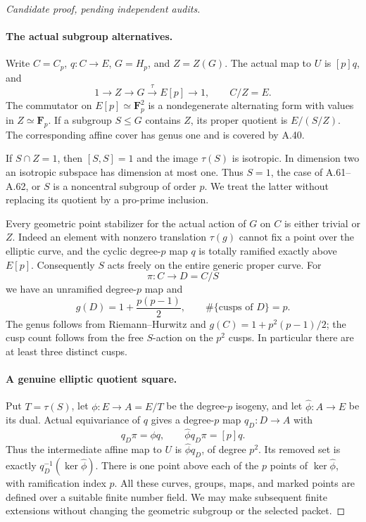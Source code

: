 \begin{proof}[Candidate proof, pending independent audits]
\paragraph{The actual subgroup alternatives.}
Write \(C=C_p\), \(q:C\to E\),
\(G=H_p\), and \(Z=Z(G)\). The actual map
to \(U\) is \([p]q\), and
\[
  1\longrightarrow Z\longrightarrow G
       \xrightarrow{\;\tau\;} E[p]\longrightarrow1,
  \qquad C/Z=E.                                      \tag{A.65.1}
\]
The commutator on \(E[p]\simeq\mathbf F_p^2\)
is a nondegenerate alternating form with values
in \(Z\simeq\mathbf F_p\). If a subgroup
\(S\le G\) contains \(Z\), its proper quotient
is \(E/(S/Z)\). The corresponding affine cover
has genus one and is covered by A.40.

If \(S\cap Z=1\), then \([S,S]=1\) and
the image \(\tau(S)\) is isotropic. In dimension
two an isotropic subspace has dimension at most
one. Thus \(S=1\), the case of A.61--A.62, or
\(S\) is a noncentral subgroup of order \(p\).
We treat the latter without replacing its quotient
by a pro-prime inclusion.

Every geometric point stabilizer for the actual
action of \(G\) on \(C\) is either trivial or
\(Z\). Indeed an element with nonzero translation
\(\tau(g)\) cannot fix a point over the elliptic
curve, and the cyclic degree-\(p\) map \(q\)
is totally ramified exactly above \(E[p]\).
Consequently \(S\) acts freely on the entire
generic proper curve. For
\[
       \pi:C\longrightarrow D=C/S
\]
we have an unramified degree-\(p\) map and
\[
 g(D)=1+\frac{p(p-1)}2,\qquad
 \#\{\text{cusps of }D\}=p.                         \tag{A.65.2}
\]
The genus follows from Riemann--Hurwitz and
\(g(C)=1+p^2(p-1)/2\); the cusp count follows
from the free \(S\)-action on the \(p^2\)
cusps. In particular there are at least three
distinct cusps.

\paragraph{A genuine elliptic quotient square.}
Put \(T=\tau(S)\), let
\(\phi:E\to A=E/T\) be the degree-\(p\)
isogeny, and let \(\widehat\phi:A\to E\)
be its dual. Actual equivariance of \(q\)
gives a degree-\(p\) map \(q_D:D\to A\)
with
\[
       q_D\pi=\phi q,\qquad
       \widehat\phi q_D\pi=[p]q.                    \tag{A.65.3}
\]
Thus the intermediate affine map to \(U\) is
\(\widehat\phi q_D\), of degree \(p^2\).
Its removed set is exactly
\(q_D^{-1}(\ker\widehat\phi)\). There is one
point above each of the \(p\) points of
\(\ker\widehat\phi\), with ramification
index \(p\). All these curves, groups, maps,
and marked points are defined over a suitable
finite number field. We may make subsequent
finite extensions without changing the geometric
subgroup or the selected packet.


\end{proof}
